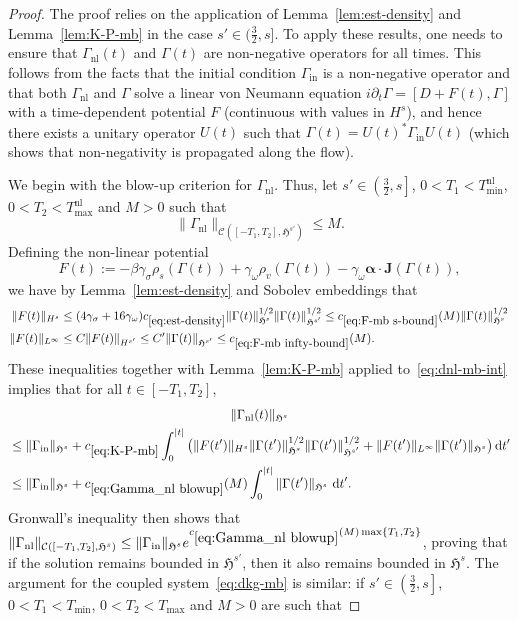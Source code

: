 \documentclass[10pt]{amsart}
\theoremstyle{definition}\newtheorem{defi}[theo]{Definition}\newtheorem{rema}[theo]{Remark}\newtheorem{exam}[theo]{Example}\newtheorem{exem}[theo]{Example}\newtheorem{nota}[theo]{Notation}
\newcommand{\rmin}{\mathrm{in}}
\newcommand{\nl}{\mathrm{nl}}
\newcommand{\cC}{\mathcal{C}}
\newcommand{\gH}{\mathfrak{H}}
\newcommand\ii{{\ensuremath {\infty}}}
\renewcommand\d[1]{{\ensuremath{\,\text{d}#1}}}
\begin{document}
\begin{proof}
The proof relies on the application of Lemma~\ref{lem:est-density} and Lemma~\ref{lem:K-P-mb} in the case $s'\in(\tfrac32,s]$. To apply these results, one needs to ensure that $\Gamma_{\nl}(t)$ and $\Gamma(t)$ are non-negative operators for all times. This follows from the facts that the initial condition $\Gamma_\rmin$ is a non-negative operator and that both $\Gamma_{\nl}$ and $\Gamma$ solve a linear von Neumann equation $i\partial_t\Gamma=[D+F(t),\Gamma]$ with a time-dependent potential $F$ (continuous with values in $H^s$), and hence there exists a unitary operator $U(t)$ such that $\Gamma(t)=U(t)^*\Gamma_\rmin U(t)$ (which shows that non-negativity is propagated along the flow).

We begin with the blow-up criterion for $\Gamma_{\nl}$. Thus, let $s'\in\left(\tfrac32,s\right]$, $0<T_1<T_{\min}^{\nl}$, $0<T_2<T_{\max}^{\nl}$ and $M>0$ such that
\[
\|\Gamma_{\nl}\|_{\cC\left([-T_1,T_2],\gH^{s'}\right)}\leq M.
\]
Defining the non-linear potential
\[
F(t):=- { \beta}\gamma_\sigma \rho_s(\Gamma(t)) + \gamma_\omega \rho_v(\Gamma(t)) - \gamma_\omega {\bm \alpha}\cdot {\bm J}(\Gamma(t)),
\]
we have by Lemma~\ref{lem:est-density} and Sobolev embeddings that
\begin{align}
\|F(t)\|_{H^s}&\leq (4\gamma_\sigma + 16 \gamma_\omega) c_{\eqref{eq:est-density}}\|\Gamma(t)\|_{\gH^s}^{1/2}\|\Gamma(t)\|_{\gH^{s'}}^{1/2}
\leq c_{\eqref{eq:F-mb s-bound}}(M)\|\Gamma(t)\|_{\gH^s}^{1/2} \label{eq:F-mb s-bound}
\,\\
\|F(t)\|_{L^\ii}&\leq C\|F(t)\|_{H^{s'}}\leq C'\|\Gamma(t)\|_{\gH^{s'}}\leq c_{\eqref{eq:F-mb infty-bound}}(M) \label{eq:F-mb infty-bound}
.
\end{align}
These inequalities together with Lemma~\ref{lem:K-P-mb} applied to~\eqref{eq:dnl-mb-int} implies that for all $t\in[-T_1,T_2]$,
\begin{multline}\label{eq:Gamma_nl blowup}
\|\Gamma_{\nl}(t)\|_{\gH^s}\\
\begin{aligned}
&\leq
\|\Gamma_{\rmin}\|_{\gH^s}+c_{\eqref{eq:K-P-mb}}\int_0^{|t|}\big(\|F(t')\|_{H^s} \|\Gamma(t')\|_{\gH^s}^{1/2} \|\Gamma(t')\|_{\gH^{s'}}^{1/2} + \|F(t')\|_{L^\infty} \|\Gamma(t')\|_{\gH^s} \big)\d t'\\
&\leq \|\Gamma_{\rmin}\|_{\gH^s}+c_{\eqref{eq:Gamma_nl blowup}}(M)\int_0^{|t|}\|\Gamma(t')\|_{\gH^s}\,\d t'. 
\end{aligned}
\end{multline}
Gronwall's inequality then shows that $\|\Gamma_{\nl}\|_{\cC([-T_1,T_2],\gH^{s})}\leq \|\Gamma_{\rmin}\|_{\gH^s} e^{c_{\eqref{eq:Gamma_nl blowup}}(M) \max\{T_1,T_2\}}$, proving that if the solution remains bounded in $\gH^{s'}$, then it also remains bounded in $\gH^s$. The argument for the coupled system~\eqref{eq:dkg-mb} is similar: if $s'\in\left(\tfrac32,s\right]$, $0<T_1<T_{\min}$, $0<T_2<T_{\max}$ and $M>0$ are such that

\end{proof}
\end{document}

